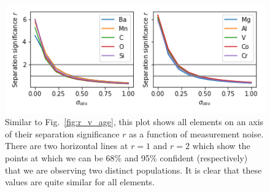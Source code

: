 \documentclass[fleqn,usenatbib]{mnras}
\begin{document}



\begin{figure}
	\includegraphics[width=\columnwidth]{figures/same_axis_r_sigma.png}
    \caption{Similar to Fig.~\ref{fig:r_v_age}, this plot shows all elements on an axis of their separation significance $r$ as a function of measurement noise. There are two horizontal lines at $r=1$ and $r=2$ which show the points at which we can be 68\% and 95\% confident (respectively) that we are observing two distinct populations. It is clear that these values are quite similar for all elements.}
    \label{fig:r_v_obs}
\end{figure}
\end{document}
